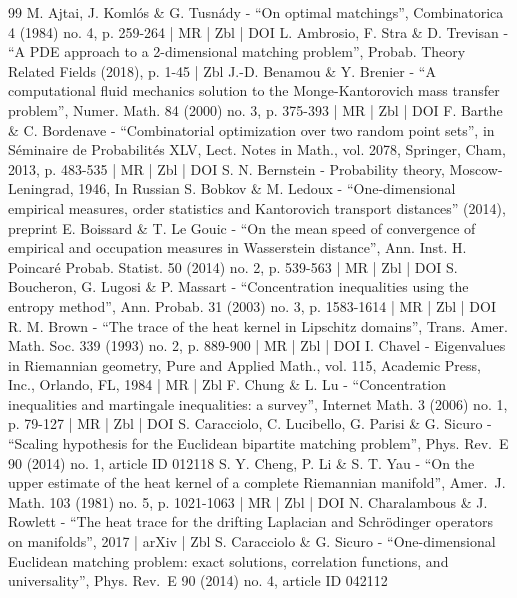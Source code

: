 \documentclass[10pt]{amsart}
\theoremstyle{plain}
\theoremstyle{definition}
\numberwithin{equation}{section}
\begin{document}
\begin{thebibliography}{99}
M. Ajtai, J. Komlós \& G. Tusnády - “On optimal matchings”, Combinatorica 4 (1984) no. 4, p. 259-264 | MR | Zbl | DOI
L. Ambrosio, F. Stra \& D. Trevisan - “A PDE approach to a 2-dimensional matching problem”, Probab. Theory Related Fields (2018), p. 1-45 | Zbl
J.-D. Benamou \& Y. Brenier - “A computational fluid mechanics solution to the Monge-Kantorovich mass transfer problem”, Numer. Math. 84 (2000) no. 3, p. 375-393 | MR | Zbl | DOI
F. Barthe \& C. Bordenave - “Combinatorial optimization over two random point sets”, in Séminaire de Probabilités XLV, Lect. Notes in Math., vol. 2078, Springer, Cham, 2013, p. 483-535 | MR | Zbl | DOI
S. N. Bernstein - Probability theory, Moscow-Leningrad, 1946, In Russian
S. Bobkov \& M. Ledoux - “One-dimensional empirical measures, order statistics and Kantorovich transport distances” (2014), preprint
E. Boissard \& T. Le Gouic - “On the mean speed of convergence of empirical and occupation measures in Wasserstein distance”, Ann. Inst. H. Poincaré Probab. Statist. 50 (2014) no. 2, p. 539-563 | MR | Zbl | DOI
S. Boucheron, G. Lugosi \& P. Massart - “Concentration inequalities using the entropy method”, Ann. Probab. 31 (2003) no. 3, p. 1583-1614 | MR | Zbl | DOI
R. M. Brown - “The trace of the heat kernel in Lipschitz domains”, Trans. Amer. Math. Soc. 339 (1993) no. 2, p. 889-900 | MR | Zbl | DOI
I. Chavel - Eigenvalues in Riemannian geometry, Pure and Applied Math., vol. 115, Academic Press, Inc., Orlando, FL, 1984 | MR | Zbl
F. Chung \& L. Lu - “Concentration inequalities and martingale inequalities: a survey”, Internet Math. 3 (2006) no. 1, p. 79-127 | MR | Zbl | DOI
S. Caracciolo, C. Lucibello, G. Parisi \& G. Sicuro - “Scaling hypothesis for the Euclidean bipartite matching problem”, Phys. Rev. E 90 (2014) no. 1, article ID 012118
S. Y. Cheng, P. Li \& S. T. Yau - “On the upper estimate of the heat kernel of a complete Riemannian manifold”, Amer. J. Math. 103 (1981) no. 5, p. 1021-1063 | MR | Zbl | DOI
N. Charalambous \& J. Rowlett - “The heat trace for the drifting Laplacian and Schrödinger operators on manifolds”, 2017 | arXiv | Zbl
S. Caracciolo \& G. Sicuro - “One-dimensional Euclidean matching problem: exact solutions, correlation functions, and universality”, Phys. Rev. E 90 (2014) no. 4, article ID 042112

\end{thebibliography}
\end{document}
